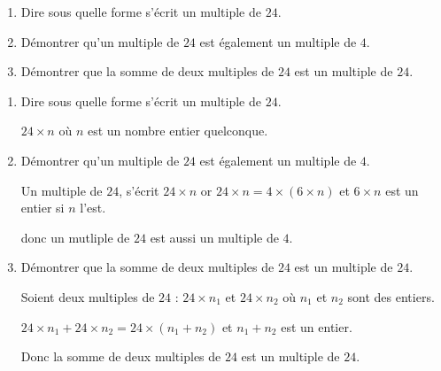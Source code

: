 \begin{exercice*}
    \begin{enumerate}
        \item Dire sous quelle forme s'écrit un multiple de $24$.
        \item Démontrer qu'un multiple de $24$ est également un multiple de $4$.
        \item Démontrer que la somme de deux multiples de $24$ est un multiple de $24$.
    \end{enumerate}
\end{exercice*}
\begin{corrige}
    \begin{enumerate}
        \item Dire sous quelle forme s'écrit un multiple de $24$.
        
        $24\times n$ où $n$ est un nombre entier quelconque.
        \item Démontrer qu'un multiple de $24$ est également un multiple de $4$.
        
        Un multiple de $24$, s'écrit $24\times n$ or $24\times n = 4\times (6\times n)$ et $6\times n$ est un entier si $n$ l'est.

        donc un mutliple de $24$ est aussi un multiple de $4$.
        \item Démontrer que la somme de deux multiples de $24$ est un multiple de $24$.
        
        Soient deux multiples de $24$ : $24\times n_1$ et $24\times n_2$ où $n_1$ et $n_2$ sont des entiers.

        $24\times n_1+24\times n_2 = 24\times (n_1+n_2)$ et $n_1+n_2$ est un entier.

        Donc la somme de deux multiples de $24$ est un multiple de $24$.
    \end{enumerate}
\end{corrige}


